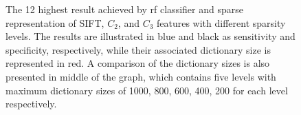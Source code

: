 \begin{figure}[!ht]
{
}
\caption[Twelve highest results obtained by Experiment~\#5]{The 12 highest result achieved by \ac{rf} classifier and sparse representation of SIFT, $C_{2}$, and $C_{3}$ features with different {\color{dgreen}sparsity levels}. The results are illustrated in {\color{blue}blue} and black as sensitivity and specificity, respectively, while their associated dictionary size  is represented in {\color{red}red}. A comparison of the dictionary sizes is also presented in middle of the graph, which contains five levels with maximum dictionary sizes of 1000, 800, 600, 400, 200 for each level respectively.} 
\label{fig:besRes}
\end{figure}
